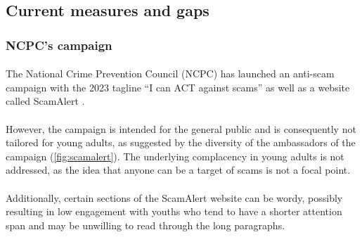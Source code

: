\message{ !name(written-report.tex)}\documentclass[a4paper]{article}
\begin{document}
\subsection{Current measures and gaps}
\subsubsection{NCPC's campaign}
\paragraph{} The National Crime Prevention Council (NCPC) has launched an
anti-scam campaign with the 2023 tagline ``I can ACT against scams''
\parencite{Sun.2023} as well as a website called ScamAlert \parencite{NCPC}.

\paragraph{} However, the campaign is intended for the general public and is
consequently not tailored for young adults, as suggested by the diversity of the
ambassadors of the campaign (\cref{fig:scamalert}). The underlying complacency
in young adults is not addressed, as the idea that anyone can be a target of
scams is not a focal point.

\paragraph{} Additionally, certain sections of the ScamAlert website can be
wordy, possibly resulting in low engagement with youths who tend to have a
shorter attention span \parencite{ChowHari.2022} and may be unwilling to read
through the long paragraphs.
\end{document}
